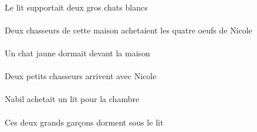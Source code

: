 \begin{exe}
\DEFSgErgP{}   \litDSgErgP{}   \INDDuAbsP{}   \grosDDuP{}   \blancDDuP{}   \chatDDuAbsP{}  \supporterVtPstDDuP{}\\
Le lit supportait deux gros chats blancs
\ex\gll
\INDDuErg{}    \DEMSgObl{}   \maisonDSgObl{}   \DE{}   \chasseurCDuErg{}   \DEFPlAbs{}    \INDSgObl{}   \NicoleDSgObl{}   \DE{}   \quatreDPl{}   \oeufDPlAbs{}  \acheterVtPstDPl{}\\
\INDDuErgP{}    \DEMSgOblP{}   \maisonDSgOblP{}   \DEP{}   \chasseurCDuErgP{}   \DEFPlAbsP{}    \INDSgOblP{}   \NicoleDSgOblP{}   \DEP{}   \quatreDPlP{}   \oeufDPlAbsP{}  \acheterVtPstDPlP{}\\
Deux chasseurs de cette maison achetaient les quatre oeufs de Nicole
\ex\gll
\INDSgAbs{}   \jauneDSg{}   \chatDSgAbs{}    \DEFSgObl{}   \maisonDSgObl{}   \DEVANT{}  \dormirViPstDSg{}\\
\INDSgAbsP{}   \jauneDSgP{}   \chatDSgAbsP{}    \DEFSgOblP{}   \maisonDSgOblP{}   \DEVANTP{}  \dormirViPstDSgP{}\\
Un chat jaune dormait devant la maison
\ex\gll
\INDSgObl{}   \NicoleDSgObl{}   \AVEC{}   \INDDuAbs{}   \petitCDu{}   \chasseurCDuAbs{}  \arriverViPrsCDu{}\\
\INDSgOblP{}   \NicoleDSgOblP{}   \AVECP{}   \INDDuAbsP{}   \petitCDuP{}   \chasseurCDuAbsP{}  \arriverViPrsCDuP{}\\
Deux petits chasseurs arrivent avec Nicole
\ex\gll
\INDSgErg{}   \NabilBSgErg{}    \DEFSgObl{}   \chambreBSgObl{}   \POUR{}   \INDSgAbs{}   \litDSgAbs{}  \acheterVtPstDSg{}\\
\INDSgErgP{}   \NabilBSgErgP{}    \DEFSgOblP{}   \chambreBSgOblP{}   \POURP{}   \INDSgAbsP{}   \litDSgAbsP{}  \acheterVtPstDSgP{}\\
Nabil achetait un lit pour la chambre
\ex\gll
\DEMDuAbs{}   \grandBDu{}   \garconBDuAbs{}    \DEFSgObl{}   \litDSgObl{}   \SOUS{}  \dormirViPrsBDu{}\\
\DEMDuAbsP{}   \grandBDuP{}   \garconBDuAbsP{}    \DEFSgOblP{}   \litDSgOblP{}   \SOUSP{}  \dormirViPrsBDuP{}\\
Ces deux grands garçons dorment sous le lit
\ex\gll
\INDPlErg{}   \grandBPl{}   \garconBPlErg{}    \DEFPlDat{}    \DEFSgObl{}   \maisonDSgObl{}   \DE{}   \filleCPlDat{}   \INDPlAbs{}   \sourisAPlAbs{}  \montrerVdPstAPl{}\\
\INDPlErgP{}   \grandBPlP{}   \garconBPlErgP{}    \DEFPlDatP{}    \DEFSgOblP{}   \maisonDSgOblP{}   \DEP{}   \filleCPlDatP{}   \INDPlAbsP{}   \sourisAPlAbsP{}  \montrerVdPstAPlP{}\\

\end{exe}
